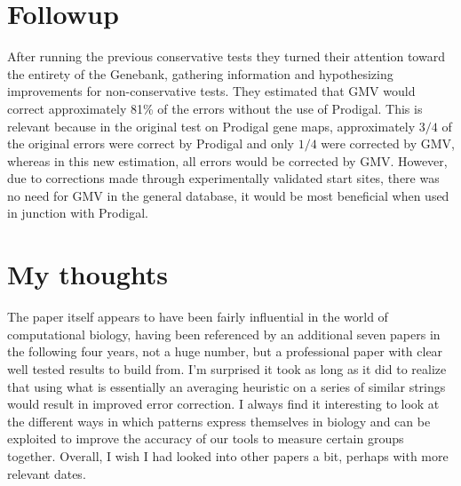\documentclass{article}
\begin{document}
\section{Followup}
After running the previous conservative tests they turned their attention toward the entirety of the Genebank, gathering information and hypothesizing improvements for non-conservative tests. They estimated that GMV would correct approximately 81\% of the errors without the use of Prodigal. This is relevant because in the original test on Prodigal gene maps, approximately $3/4$ of the original errors were correct by Prodigal and only $1/4$ were corrected by GMV, whereas in this new estimation, all errors would be corrected by GMV. However, due to corrections made through experimentally validated start sites, there was no need for GMV in the general database, it would be most beneficial when used in junction with Prodigal.

\section{My thoughts}
The paper itself appears to have been fairly influential in the world of computational biology, having been referenced by an additional seven papers in the following four years, not a huge number, but a professional paper with clear well tested results to build from. I'm surprised it took as long as it did to realize that using what is essentially an averaging heuristic on a series of similar strings would result in improved error correction. I always find it interesting to look at the different ways in which patterns express themselves in biology and can be exploited to improve the accuracy of our tools to measure certain groups together. Overall, I wish I had looked into other papers a bit, perhaps with more relevant dates.

\newpage


\end{document}
